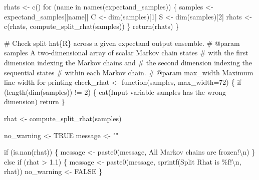 \documentclass[
  letterpaper,
  DIV=11,
  numbers=noendperiod]{scrartcl}
\newenvironment{Shaded}{\begin{snugshade}}{\end{snugshade}}
\newcommand{\AttributeTok}[1]{\textcolor[rgb]{0.40,0.45,0.13}{#1}}
\newcommand{\CommentTok}[1]{\textcolor[rgb]{0.37,0.37,0.37}{#1}}
\newcommand{\ConstantTok}[1]{\textcolor[rgb]{0.56,0.35,0.01}{#1}}
\newcommand{\ControlFlowTok}[1]{\textcolor[rgb]{0.00,0.23,0.31}{#1}}
\newcommand{\DecValTok}[1]{\textcolor[rgb]{0.68,0.00,0.00}{#1}}
\newcommand{\FloatTok}[1]{\textcolor[rgb]{0.68,0.00,0.00}{#1}}
\newcommand{\FunctionTok}[1]{\textcolor[rgb]{0.28,0.35,0.67}{#1}}
\newcommand{\NormalTok}[1]{\textcolor[rgb]{0.00,0.23,0.31}{#1}}
\newcommand{\OtherTok}[1]{\textcolor[rgb]{0.00,0.23,0.31}{#1}}
\newcommand{\SpecialCharTok}[1]{\textcolor[rgb]{0.37,0.37,0.37}{#1}}
\newcommand{\StringTok}[1]{\textcolor[rgb]{0.13,0.47,0.30}{#1}}
\begin{document}
\begin{Shaded}
\begin{Highlighting}[]
\NormalTok{  rhats }\OtherTok{\textless{}{-}} \FunctionTok{c}\NormalTok{()}
  \ControlFlowTok{for}\NormalTok{ (name }\ControlFlowTok{in} \FunctionTok{names}\NormalTok{(expectand\_samples)) \{}
\NormalTok{    samples }\OtherTok{\textless{}{-}}\NormalTok{ expectand\_samples[[name]]}
\NormalTok{    C }\OtherTok{\textless{}{-}} \FunctionTok{dim}\NormalTok{(samples)[}\DecValTok{1}\NormalTok{]}
\NormalTok{    S }\OtherTok{\textless{}{-}} \FunctionTok{dim}\NormalTok{(samples)[}\DecValTok{2}\NormalTok{]}
\NormalTok{    rhats }\OtherTok{\textless{}{-}} \FunctionTok{c}\NormalTok{(rhats, }\FunctionTok{compute\_split\_rhat}\NormalTok{(samples))}
\NormalTok{  \}}
  \FunctionTok{return}\NormalTok{(rhats)}
\NormalTok{\}}

\CommentTok{\# Check split hat\{R\} across a given expectand output ensemble.}
\CommentTok{\# @param samples A two{-}dimensional array of scalar Markov chain states }
\CommentTok{\#                with the first dimension indexing the Markov chains and }
\CommentTok{\#                the second dimension indexing the sequential states }
\CommentTok{\#                within each Markov chain.}
\CommentTok{\# @param max\_width Maximum line width for printing}
\NormalTok{check\_rhat }\OtherTok{\textless{}{-}} \ControlFlowTok{function}\NormalTok{(samples, }\AttributeTok{max\_width=}\DecValTok{72}\NormalTok{) \{}
  \ControlFlowTok{if}\NormalTok{ (}\FunctionTok{length}\NormalTok{(}\FunctionTok{dim}\NormalTok{(samples)) }\SpecialCharTok{!=} \DecValTok{2}\NormalTok{) \{}
    \FunctionTok{cat}\NormalTok{(}\StringTok{\textquotesingle{}Input variable \textasciigrave{}samples\textasciigrave{} has the wrong dimension\textquotesingle{}}\NormalTok{)}
\NormalTok{    return}
\NormalTok{  \}}

\NormalTok{  rhat }\OtherTok{\textless{}{-}} \FunctionTok{compute\_split\_rhat}\NormalTok{(samples)}

\NormalTok{  no\_warning }\OtherTok{\textless{}{-}} \ConstantTok{TRUE}
\NormalTok{  message }\OtherTok{\textless{}{-}} \StringTok{""}

  \ControlFlowTok{if}\NormalTok{ (}\FunctionTok{is.nan}\NormalTok{(rhat)) \{}
\NormalTok{    message }\OtherTok{\textless{}{-}} \FunctionTok{paste0}\NormalTok{(message, }\StringTok{\textquotesingle{}All Markov chains are frozen!}\SpecialCharTok{\textbackslash{}n}\StringTok{\textquotesingle{}}\NormalTok{)}
\NormalTok{  \} }\ControlFlowTok{else} \ControlFlowTok{if}\NormalTok{ (rhat }\SpecialCharTok{\textgreater{}} \FloatTok{1.1}\NormalTok{) \{}
\NormalTok{    message }\OtherTok{\textless{}{-}} \FunctionTok{paste0}\NormalTok{(message, }\FunctionTok{sprintf}\NormalTok{(}\StringTok{\textquotesingle{}Split Rhat is \%f!}\SpecialCharTok{\textbackslash{}n}\StringTok{\textquotesingle{}}\NormalTok{, rhat))}
\NormalTok{    no\_warning }\OtherTok{\textless{}{-}} \ConstantTok{FALSE}
\NormalTok{  \}}
  

\end{Highlighting}
\end{Shaded}
\end{document}
